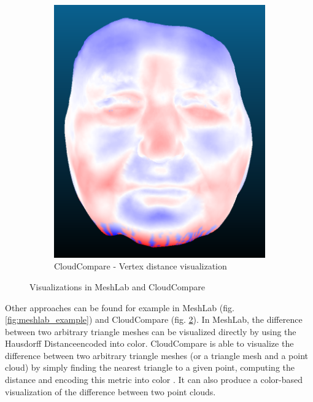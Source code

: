 \begin{figure}[h]
\begin{subfigure}{0.3\textwidth}
	\includegraphics[width=\textwidth]{./img/cloudcompare-example01.PNG}
    \caption{CloudCompare - Vertex distance visualization}
    \label{fig:cloudcompare_example}
	\end{subfigure}
\caption{Visualizations in MeshLab and CloudCompare}
\end{figure}

Other approaches can be found for example in MeshLab (fig. \ref{fig:meshlab_example}) and CloudCompare (fig. \ref{fig:cloudcompare_example}). In MeshLab, the difference between two arbitrary triangle meshes can be visualized directly by using the Hausdorff Distance\footnotemark encoded into color. CloudCompare is able to visualize the difference between two arbitrary triangle meshes (or a triangle mesh and a point cloud) by simply finding the nearest triangle to a given point, computing the distance and encoding this metric into color \citep{CloudCmpDistance}. It can also produce a color-based visualization of the difference between two point clouds.

